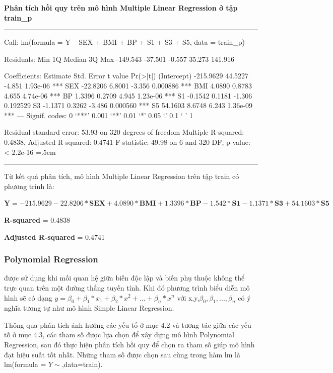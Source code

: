 \documentclass[runningheads]{llncs}
\newenvironment{lcverbatim}
 {\SaveVerbatim{cverb}}
 {\endSaveVerbatim
  \flushleft\fboxrule=0pt\fboxsep=.5em
  \colorbox{cverbbg}{%
    \makebox[\dimexpr\linewidth-2\fboxsep][l]{\BUseVerbatim{cverb}}%
  }
  \endflushleft
}
\begin{document}
\vspace{0.5cm}
\textbf{Phân tích hồi quy trên mô hình Multiple Linear Regression ở tập train\_p}
\vspace{0.5cm}
\hrule
\begin{lcverbatim}
Call:
lm(formula = Y ~ SEX + BMI + BP + S1 + S3 + S5, data = train_p)

Residuals:
     Min       1Q   Median       3Q      Max 
-149.543  -37.501   -0.557   35.273  141.916 

Coefficients:
             Estimate Std. Error t value Pr(>|t|)    
(Intercept) -215.9629    44.5227  -4.851 1.93e-06 ***
SEX          -22.8206     6.8001  -3.356 0.000886 ***
BMI            4.0890     0.8783   4.655 4.74e-06 ***
BP             1.3396     0.2709   4.945 1.23e-06 ***
S1            -0.1542     0.1181  -1.306 0.192529    
S3            -1.1371     0.3262  -3.486 0.000560 ***
S5            54.1603     8.6748   6.243 1.36e-09 ***
---
Signif. codes:  0 ‘***’ 0.001 ‘**’ 0.01 ‘*’ 0.05 ‘.’ 0.1 ‘ ’ 1

Residual standard error: 53.93 on 320 degrees of freedom
Multiple R-squared:  0.4838,	Adjusted R-squared:  0.4741 
F-statistic: 49.98 on 6 and 320 DF,  p-value: < 2.2e-16
\end{lcverbatim}
\hrule
\vspace{0.5cm}

Từ kết quả phân tích, mô hình Multiple Linear Regression trên tập train có phương trình là:
\begin{center}
	$\textbf{Y}=  -215.9629 -22.8206* \textbf{SEX} + 4.0890*\textbf{BMI} +  1.3396*\textbf{BP} -
	1.542*\textbf{S1} -1.1371*\textbf{S3} + 54.1603*\textbf{S5}$
\end{center}

\textbf{R-squared} = 0.4838

\textbf{Adjusted R-squared} = 0.4741

\subsubsection{Polynomial Regression} được sử dụng khi mối quan hệ giữa biến độc lập và biến phụ thuộc không thể trực quan trên một đường thẳng tuyến tính. Khi đó phương trình biểu diễn mô hình sẽ có dạng $y= \beta_0 +\beta_1*x_1+\beta_2*x^2+...+\beta_n*x^n$ với x,y,$\beta_0, \beta_1,...,\beta_n$
có ý nghĩa tương tự như mô hình Simple Linear Regression.

Thông qua phân tích ảnh hưởng các yếu tố ở mục 4.2 và tương tác giữa các yếu tố ở mục 4.3, các tham số được lựa chọn để xây dựng mô hình Polynomial Regression, sau đó thực hiện phân tích hồi quy để chọn ra tham số giúp mô hình đạt hiệu suất tốt nhất. Những tham số được chọn sau cùng trong hàm lm là
lm(formula = $Y\sim $,data=train).
\end{document}
